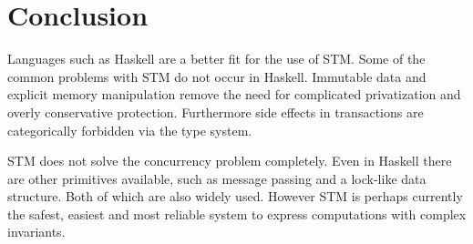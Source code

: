 \section{Conclusion}

\label{sec:conclusion}

Languages such as Haskell are a better fit for the use of STM. Some of the
common problems with STM do not occur in Haskell. Immutable data and explicit
memory manipulation remove the need for complicated privatization and overly
conservative protection. Furthermore side effects in transactions are
categorically forbidden via the type system.

STM does not solve the concurrency problem completely. Even in Haskell there are
other primitives available, such as message passing and a lock-like
data structure. Both of which are also widely used. However STM is perhaps
currently the safest, easiest and most reliable system to express computations
with complex invariants.
